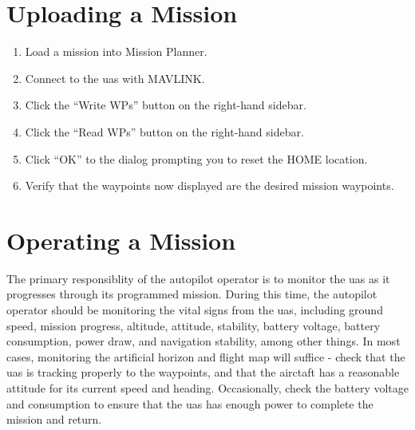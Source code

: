 \documentclass{report}
\begin{document}
	\section{Uploading a Mission}
		\begin{enumerate}
			\item Load a mission into Mission Planner.
			\item Connect to the \gls{uas} with MAVLINK.
			\item Click the ``Write WPs'' button on the right-hand sidebar.
			\item Click the ``Read WPs'' button on the right-hand sidebar.
			\item Click ``OK'' to the dialog prompting you to reset the HOME location.
			\item Verify that the waypoints now displayed are the desired mission waypoints.
		\end{enumerate}
	\section{Operating a Mission}
		The primary responsiblity of the autopilot operator is to monitor the \gls{uas} as it progresses through its programmed mission.  During this time, the autopilot operator should be monitoring the vital signs from the \gls{uas}, including ground speed, mission progress, altitude, attitude, stability, battery voltage, battery consumption, power draw, and navigation stability, among other things.  In most cases, monitoring the artificial horizon and flight map will suffice - check that the \gls{uas} is tracking properly to the waypoints, and that the airctaft has a reasonable attitude for its current speed and heading.  Occasionally, check the battery voltage and consumption to ensure that the \gls{uas} has enough power to complete the mission and return.
\printglossaries
\end{document}
